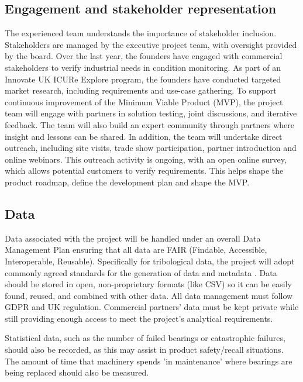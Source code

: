 \documentclass[runningheads]{llncs}
\begin{document}
\subsection{Engagement and stakeholder representation}
    The experienced team understands the importance of stakeholder inclusion. Stakeholders are managed by the executive project team, with oversight provided by the board. Over the last year, the founders have engaged with commercial stakeholders to verify industrial needs in condition monitoring. As part of an Innovate UK ICURe Explore program, the founders have conducted targeted market research, including requirements and use-case gathering. To support continuous improvement of the Minimum Viable Product (MVP), the project team will engage with partners in solution testing, joint discussions, and iterative feedback. The team will also build an expert community through partners where insight and lessons can be shared. In addition, the team will undertake direct outreach, including site visits, trade show participation, partner introduction and online webinars. This outreach activity is ongoing, with an open online survey, which allows potential customers to verify requirements. This helps shape the product roadmap, define the development plan and shape the MVP.
\subsection{Data}
    Data associated with the project will be handled under an overall Data Management Plan ensuring that all data are FAIR (Findable, Accessible, Interoperable, Reusable). Specifically for tribological data, the project will adopt commonly agreed standards for the generation of data and metadata \cite{garabedian_2022}. Data should be stored in open, non-proprietary formats (like CSV) so it can be easily found, reused, and combined with other data. All data management must follow GDPR and UK regulation. Commercial partners' data must be kept private while still providing enough access to meet the project's analytical requirements.
    
    Statistical data, such as the number of failed bearings or catastrophic failures, should also be recorded, as this may assist in product safety/recall situations. The amount of time that machinery spends 'in maintenance' where bearings are being replaced should also be measured.
\end{document}
